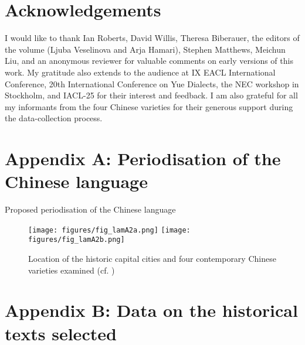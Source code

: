 \documentclass[output=paper]{langscibook}
\begin{document}
\section*{Acknowledgements}

I would like to thank Ian Roberts, David Willis, Theresa Biberauer, the editors of the volume (Ljuba Veselinova and Arja Hamari), Stephen Matthews, Meichun Liu, and an anonymous reviewer for valuable comments on early versions of this work. My gratitude also extends to the audience at IX EACL International Conference, 20th International Conference on Yue Dialects, the NEC workshop in Stockholm, and IACL-25 for their interest and feedback. I am also grateful for all my informants from the four Chinese varieties for their generous support during the data-collection process. 



\section*{Appendix \hypertarget{app:lamA}{A}: Periodisation of the Chinese language}


\begin{table}
	\caption{Proposed periodisation of the Chinese language}
	\label{tab:lamA1}
\end{table}

\begin{figure}
	\caption{Location of the historic capital cities and four contemporary Chinese varieties
	examined (cf. \citealt{Zhou1995, Wan1958})}
	\label{fig:lamA2}
	\texttt{[image: figures/fig\_lamA2a.png]}
	\texttt{[image: figures/fig\_lamA2b.png]}
\end{figure}

\clearpage
\section*{Appendix \hypertarget{app:lamB}{B}: Data on the historical texts selected}
\end{document}
